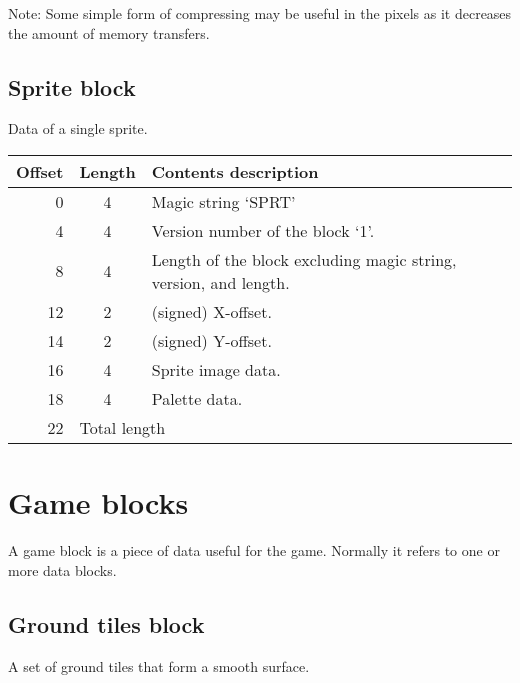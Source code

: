 \documentclass{article}
\begin{document}
\medskip
Note: Some simple form of compressing may be useful in the pixels as it
decreases the amount of memory transfers.


\subsection{Sprite block}
Data of a single sprite.

\begin{center}
\begin{tabular}{|r|c|l|} \hline
\textbf{Offset} & \textbf{Length} & \textbf{Contents description} \\ \hline
 0 & 4 & Magic string `SPRT' \\
 4 & 4 & Version number of the block `1'. \\
 8 & 4 & Length of the block excluding magic string, version, and length. \\
12 & 2 & (signed) X-offset. \\
14 & 2 & (signed) Y-offset. \\
16 & 4 & Sprite image data. \\
18 & 4 & Palette data. \\ \hline
22 & \multicolumn{2}{l|}{Total length} \\ \hline
\end{tabular}
\end{center}


\section{Game blocks}
A game block is a piece of data useful for the game. Normally it refers to one
or more data blocks.

\subsection{Ground tiles block}
A set of ground tiles that form a smooth surface.
\end{document}
